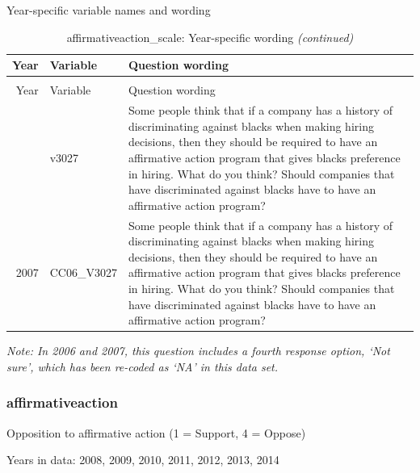 \documentclass[12pt]{article}
\begin{document}
\endgroup{}

Year-specific variable names and wording

\begin{longtable}[t]{rl>{\raggedright\arraybackslash}p{10cm}}
\caption{\label{tab:unnamed-chunk-4}affirmativeaction\_scale: Year-specific wording}\\
\toprule
Year & Variable & Question wording\\
\midrule
\endfirsthead
\caption[]{affirmativeaction\_scale: Year-specific wording \textit{(continued)}}\\
\toprule
Year & Variable & Question wording\\
\midrule
\endhead
\
\endfoot
\bottomrule
\endlastfoot
2006 & v3027 & Some people think that if a company has a history of discriminating against blacks when making hiring decisions, then they should be required to have an affirmative action program that gives blacks preference in hiring.    What do you think? Should companies that have discriminated against blacks have to have an affirmative action program?\\
2007 & CC06\_V3027 & Some people think that if a company has a history of discriminating against blacks when making hiring decisions, then they should be required to have an affirmative action program that gives blacks preference in hiring. What do you think? Should companies that have discriminated against blacks have to have an affirmative action program?\\*
\end{longtable}

\emph{Note: In 2006 and 2007, this question includes a fourth response
option, `Not sure', which has been re-coded as `NA' in this data set.}

\subsubsection{affirmativeaction}\label{affirmativeaction}

Opposition to affirmative action (1 = Support, 4 = Oppose)

Years in data: 2008, 2009, 2010, 2011, 2012, 2013,
2014\begingroup\fontsize{10}{12}\selectfont
\end{document}
